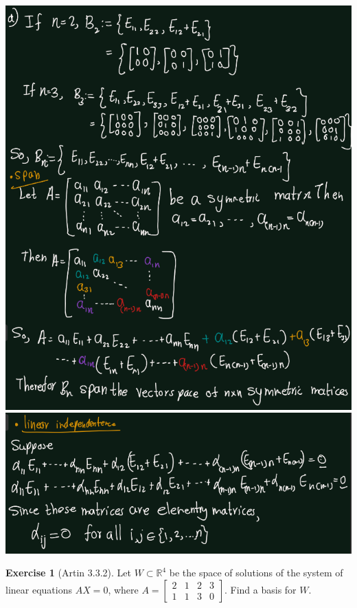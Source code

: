 \documentclass[
]{book}
\theoremstyle{definition}
\theoremstyle{definition}
\theoremstyle{definition}
\newtheorem{exercise}{Exercise}[chapter]
\theoremstyle{definition}
\theoremstyle{remark}
\begin{document}
\includegraphics{figures/ch_3/ex-3.1-1.png}
\includegraphics{figures/ch_3/ex-3.1-2.png}

\begin{exercise}[Artin 3.3.2]
\protect\hypertarget{exr:unnamed-chunk-292}{}\label{exr:unnamed-chunk-292}Let \(W \subset \mathbb{R}^4\) be the space of solutions of the system of linear equations \(AX = 0\), where
\(A =\begin{bmatrix} 2 & 1 & 2 & 3 \\ 1 & 1 & 3 & 0 \end{bmatrix}\).
Find a basis for \(W\).
\end{exercise}
\end{document}
